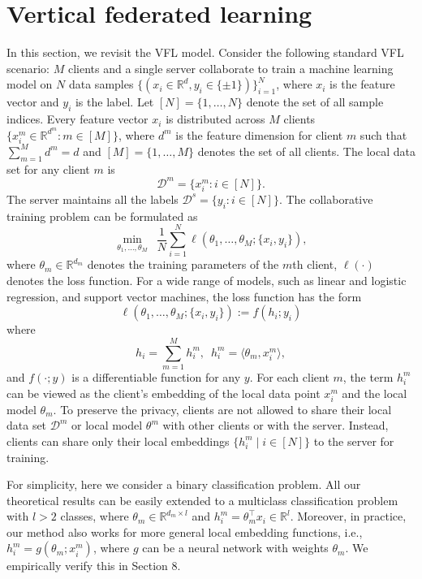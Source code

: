 \section{Vertical federated learning} \label{sec:8.3}
In this section, we revisit the VFL model. Consider the following standard VFL scenario: $M$ clients and a single server collaborate to train a machine learning model on $N$ data samples $\{(x_i \in \mathbb{R}^d, y_i \in \{\pm 1\})\}_{i=1}^N$, where $x_i$ is the feature vector and $y_i$ is the label. Let $[N] = \{1, \dots, N\}$ denote the set of all sample indices. 
Every feature vector $x_i$ is distributed across $M$ clients $\{x^m_i\in\mathbb{R}^{d^m}: m \in [M]\}$, where $d^m$ is the feature dimension for client $m$ such that $\sum_{m=1}^M d^m = d$ and $[M] = \{1,\dots, M\}$ denotes the set of all clients. The local data set for any client $m$ is
\[\mathcal{D}^m = \{x_i^m : i \in [N]\}.\]
The server maintains all the labels $\mathcal{D}^s = \{y_i: i \in [N]\}$. 
The collaborative training problem can be formulated as
\begin{equation} \label{eq:main_prob3}
    \min_{\theta_1, \dots, \theta_M} \enspace \frac{1}{N}\sum_{i=1}^N \ell\left(\theta_1, \dots, \theta_M; \{x_i, y_i\} \right),
\end{equation}
where $\theta_m \in \mathbb{R}^{d_m}$ denotes the training parameters of the $m$th client, $\ell(\cdot)$ denotes the loss function. For a wide range of models, such as linear and logistic regression, and support vector machines, the loss function has the form
\begin{equation} \label{eq:loss_function}
     \ell\left(\theta_1, \dots, \theta_M; \{x_i, y_i\} \right) 
     := 
     f\left( h_i; y_i\right)
\end{equation}
where 
\[h_i = \sum_{m=1}^M h_i^m, \enspace h_i^m = \langle \theta_m, x_i^m \rangle,\]
and $f(\cdot; y)$ is a differentiable function for any $y$. For each client $m$, the term $h_i^m$ can be viewed as the client's embedding of the local data point $x_i^m$ and the local model $\theta_m$. To preserve the privacy, clients are not allowed to share their local data set $\mathcal{D}^m$ or local model $\theta^m$ with other clients or with the server. Instead, clients can share only their local embeddings $\{h_i^m\mid i\in[N]\}$ to the server for training. 

For simplicity, here we consider a binary classification problem. All our theoretical results can be easily extended to a multiclass classification problem with $l > 2$ classes, where $\theta_m \in \mathbb{R}^{d_m \times l}$ and $h_i^m = \theta_m^\intercal x_i \in \mathbb{R}^l$. Moreover, in practice, our method also works for more general local embedding functions, i.e., $h_i^m = g(\theta_m; x_i^m)$, where $g$ can be a neural network with weights $\theta_m$. We empirically verify this in Section 8.

